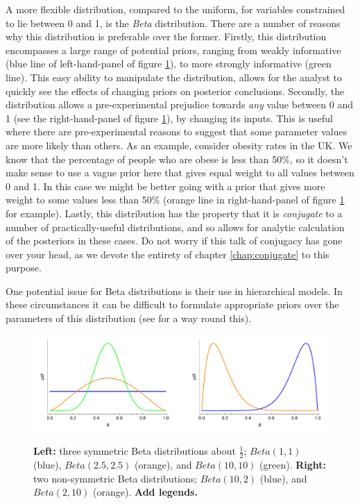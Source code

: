 \documentclass[11pt,fullpage]{book}
\begin{document}
A more flexible distribution, compared to the uniform, for variables constrained to lie between 0 and 1, is the \textit{Beta} distribution. There are a number of reasons why this distribution is preferable over the former. Firstly, this distribution encompasses a large range of potential priors, ranging from weakly informative (blue line of left-hand-panel of figure \ref{fig:Distributions_betaDistribution}), to more strongly informative (green line). This easy ability to manipulate the distribution, allows for the analyst to quickly see the effects of changing priors on posterior conclusions. Secondly, the distribution allows a pre-experimental prejudice towards \textit{any} value between 0 and 1 (see the right-hand-panel of figure \ref{fig:Distributions_betaDistribution}), by changing its inputs. This is useful where there are pre-experimental reasons to suggest that some parameter values are more likely than others. As an example, consider obesity rates in the UK. We know that the percentage of people who are obese is less than 50\%, so it doesn't make sense to use a vague prior here that gives equal weight to all values between 0 and 1. In this case we might be better going with a prior that gives more weight to some values less than 50\% (orange line in right-hand-panel of figure \ref{fig:Distributions_betaDistribution} for example). Lastly, this distribution has the property that it is \textit{conjugate} to a number of practically-useful distributions, and so allows for analytic calculation of the posteriors in these cases. Do not worry if this talk of conjugacy has gone over your head, as we devote the entirety of chapter \ref{chap:conjugate} to this purpose.

One potential issue for Beta distributions is their use in hierarchical models. In these circumstances it can be difficult to formulate appropriate priors over the parameters of this distribution (see \cite{gelman2013bayesian} for a way round this).

\begin{figure}
\centering
\scalebox{0.3} 
{\includegraphics{Distributions_betaDistribution.pdf}}
\caption{\textbf{Left:} three symmetric Beta distributions about $\frac{1}{2}$; $Beta(1,1)$ (blue), $Beta(2.5,2.5)$ (orange), and $Beta(10,10)$ (green). \textbf{Right:} two non-symmetric Beta distributions; $Beta(10,2)$ (blue), and $Beta(2,10)$ (orange). \textbf{Add legends.}}\label{fig:Distributions_betaDistribution}
\end{figure}
\end{document}
